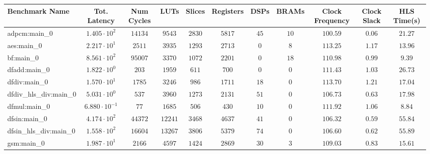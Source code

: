 \begin{tabular}{|l|c|c|c|c|c|c|c|c|c|c|}
\hline
Benchmark Name          & Tot. Latency            & Num Cycles & LUTs      & Slices    & Registers & DSPs    & BRAMs   & Clock Frequency & Clock Slack & HLS Time(s) \\
\hline
adpcm:main\_0           & $ 1.405 \cdot 10^{2}  $ & $ 14134  $ & $ 9543  $ & $ 2830  $ & $ 5817  $ & $ 45  $ & $ 10  $ & $ 100.59      $ & $ 0.06    $ & $ 21.27   $ \\
aes:main\_0             & $ 2.217 \cdot 10^{1}  $ & $ 2511   $ & $ 3935  $ & $ 1293  $ & $ 2713  $ & $ 0   $ & $ 8   $ & $ 113.25      $ & $ 1.17    $ & $ 13.96   $ \\
bf:main\_0              & $ 8.561 \cdot 10^{2}  $ & $ 95007  $ & $ 3370  $ & $ 1072  $ & $ 2201  $ & $ 0   $ & $ 18  $ & $ 110.98      $ & $ 0.99    $ & $ 9.39    $ \\
dfadd:main\_0           & $ 1.822 \cdot 10^{0}  $ & $ 203    $ & $ 1959  $ & $ 611   $ & $ 700   $ & $ 0   $ & $ 0   $ & $ 111.43      $ & $ 1.03    $ & $ 26.73   $ \\
dfdiv:main\_0           & $ 1.570 \cdot 10^{1}  $ & $ 1785   $ & $ 3246  $ & $ 986   $ & $ 1711  $ & $ 18  $ & $ 0   $ & $ 113.70      $ & $ 1.21    $ & $ 17.04   $ \\
dfdiv\_hls\_div:main\_0 & $ 5.031 \cdot 10^{0}  $ & $ 537    $ & $ 3960  $ & $ 1273  $ & $ 2131  $ & $ 51  $ & $ 0   $ & $ 106.73      $ & $ 0.63    $ & $ 17.98   $ \\
dfmul:main\_0           & $ 6.880 \cdot 10^{-1} $ & $ 77     $ & $ 1685  $ & $ 506   $ & $ 430   $ & $ 10  $ & $ 0   $ & $ 111.92      $ & $ 1.06    $ & $ 8.84    $ \\
dfsin:main\_0           & $ 4.174 \cdot 10^{2}  $ & $ 44372  $ & $ 12241 $ & $ 3468  $ & $ 4637  $ & $ 41  $ & $ 0   $ & $ 106.32      $ & $ 0.59    $ & $ 55.84   $ \\
dfsin\_hls\_div:main\_0 & $ 1.558 \cdot 10^{2}  $ & $ 16604  $ & $ 13267 $ & $ 3806  $ & $ 5379  $ & $ 74  $ & $ 0   $ & $ 106.60      $ & $ 0.62    $ & $ 55.89   $ \\
gsm:main\_0             & $ 1.987 \cdot 10^{1}  $ & $ 2166   $ & $ 4597  $ & $ 1424  $ & $ 2869  $ & $ 30  $ & $ 3   $ & $ 109.03      $ & $ 0.83    $ & $ 15.61   $ \\

\end{tabular}
